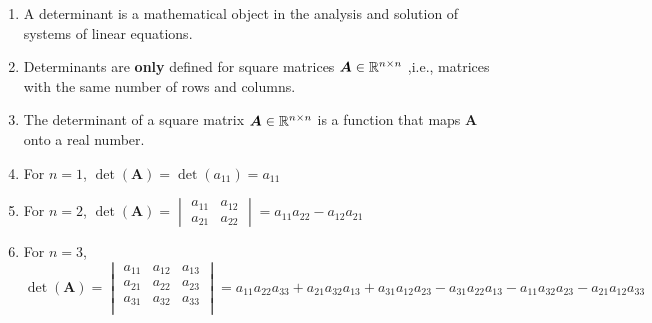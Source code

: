 \begin{enumerate}
    \item 
    \begin{definition}[Determinant]
        A determinant is a mathematical object in the analysis and solution of systems of linear equations.
        \hfill \cite{mfml/book/mml/Deisenroth-Faisal-Ong}
    \end{definition}

    \item Determinants are \textbf{only} defined for square matrices $\bm{A} \in \mathbb{R}^{n\times n}$ ,i.e., matrices with the same number of rows and columns.
    \hfill \cite{mfml/book/mml/Deisenroth-Faisal-Ong}

    \item The determinant of a square matrix $\bm{A} \in \mathbb{R}^{n\times n}$ is a function that maps $\bm{A}$ onto a real number.
    \hfill \cite{mfml/book/mml/Deisenroth-Faisal-Ong}

    \item For $n=1$, $\det(\bm{A}) = \det(a_{11}) = a_{11}$
    \hfill \cite{mfml/book/mml/Deisenroth-Faisal-Ong}

    \item For $n=2$, 
    $
        \det(\bm{A}) 
        = \begin{vmatrix}
            a_{11} & a_{12} \\
            a_{21} & a_{22}
        \end{vmatrix} 
        = a_{11} a_{22} - a_{12} a_{21}
    $
    \hfill \cite{mfml/book/mml/Deisenroth-Faisal-Ong}

    \item  
    \begin{definition}
        For $n=3$, 
        \hfill \cite{mfml/book/mml/Deisenroth-Faisal-Ong}
        \\[0.3cm]
        $
            \det(\bm{A}) 
            = \begin{vmatrix}
                a_{11} & a_{12} & a_{13} \\
                a_{21} & a_{22} & a_{23} \\
                a_{31} & a_{32} & a_{33} \\
            \end{vmatrix} 
            = a_{11} a_{22} a_{33}  + a_{21} a_{32} a_{13}  + a_{31} a_{12} a_{23}  - a_{31} a_{22} a_{13}  - a_{11} a_{32} a_{23}  - a_{21} a_{12} a_{33} 
        $
        \hfill \cite{mfml/book/mml/Deisenroth-Faisal-Ong}
    \end{definition}


\end{enumerate}

